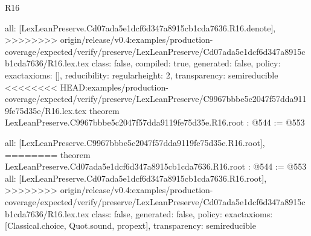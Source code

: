 \begin{lexlean}{R16}
\begin{coremodule}
{{{{{  all: [LexLeanPreserve.Cd07ada5e1dcf6d347a8915cb1cda7636.R16.denote],
>>>>>>>> origin/release/v0.4:examples/production-coverage/expected/verify/preserve/LexLeanPreserve/Cd07ada5e1dcf6d347a8915cb1cda7636/R16.lex.tex
  class: false,
  compiled: true,
  generated: false,
  policy: exact{axioms: []},
  reducibility: regular{height: 2},
  transparency: semireducible
}
<<<<<<<< HEAD:examples/production-coverage/expected/verify/preserve/LexLeanPreserve/C9967bbbe5c2047f57dda9119fe75d35e/R16.lex.tex
theorem LexLeanPreserve.C9967bbbe5c2047f57dda9119fe75d35e.R16.root : @544 := @553 {
  all: [LexLeanPreserve.C9967bbbe5c2047f57dda9119fe75d35e.R16.root],
========
theorem LexLeanPreserve.Cd07ada5e1dcf6d347a8915cb1cda7636.R16.root : @544 := @553 {
  all: [LexLeanPreserve.Cd07ada5e1dcf6d347a8915cb1cda7636.R16.root],
>>>>>>>> origin/release/v0.4:examples/production-coverage/expected/verify/preserve/LexLeanPreserve/Cd07ada5e1dcf6d347a8915cb1cda7636/R16.lex.tex
  class: false,
  generated: false,
  policy: exact{axioms: [Classical.choice, Quot.sound, propext]},
  transparency: semireducible
}

}}}}}
\end{coremodule}
\end{lexlean}

